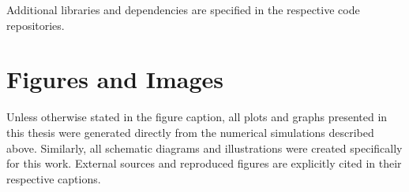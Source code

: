 Additional libraries and dependencies are specified in the respective code repositories.

\section{Figures and Images}

Unless otherwise stated in the figure caption, all plots and graphs presented in this thesis were generated directly from the numerical simulations described above. Similarly, all schematic diagrams and illustrations were created specifically for this work. External sources and reproduced figures are explicitly cited in their respective captions.
